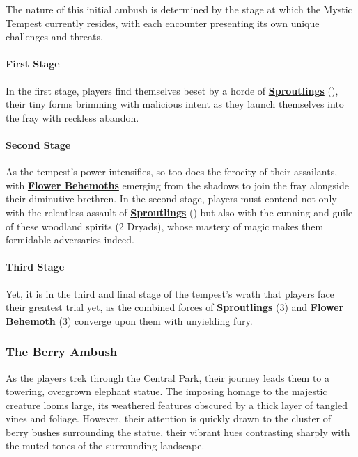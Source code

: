 The nature of this initial ambush is determined by the stage at which the Mystic Tempest currently resides, with each encounter presenting its own unique challenges and threats.\\

\paragraph*{First Stage}
In the first stage, players find themselves beset by a horde of \hyperref[sec:Sproutling]{\textbf{Sproutlings}} (), their tiny forms brimming with malicious intent as they launch themselves into the fray with reckless abandon.

\paragraph*{Second Stage}
As the tempest's power intensifies, so too does the ferocity of their assailants, with \hyperref[sec:FlowerBehemoth]{\textbf{Flower Behemoths}} emerging from the shadows to join the fray alongside their diminutive brethren. In the second stage, players must contend not only with the relentless assault of \hyperref[sec:Sproutling]{\textbf{Sproutlings}} () but also with the cunning and guile of these woodland spirits (2 Dryads), whose mastery of magic makes them formidable adversaries indeed.

\paragraph*{Third Stage}
Yet, it is in the third and final stage of the tempest's wrath that players face their greatest trial yet, as the combined forces of \hyperref[sec:Sproutling]{\textbf{Sproutlings}} (3) and \hyperref[sec:FlowerBehemoth]{\textbf{Flower Behemoth}} (3) converge upon them with unyielding fury.

\subsubsection*{The Berry Ambush}
As the players trek through the Central Park, their journey leads them to a towering, overgrown elephant statue. The imposing homage to the majestic creature looms large, its weathered features obscured by a thick layer of tangled vines and foliage. However, their attention is quickly drawn to the cluster of berry bushes surrounding the statue, their vibrant hues contrasting sharply with the muted tones of the surrounding landscape.

